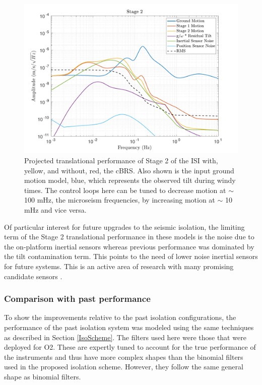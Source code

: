 \documentclass [12pt, proquest]{uwthesis}[2019]
\begin{document}
\begin{figure}[!h]
\begin{center}
\includegraphics[width=\textwidth]{cBRS_Model_ST2X.pdf}
\caption[Projected translational performance of Stage 2 of the ISI] {Projected translational performance of Stage 2 of the ISI with, yellow, and without, red, the cBRS. Also shown is the input ground motion model, blue, which represents the observed tilt during windy times. The control loops here can be tuned to decrease motion at $\sim$ 100 mHz, the microseism frequencies, by increasing motion at $\sim$ 10 mHz and vice versa.}
\label{cBRS2X}
\end{center}
\end{figure}

Of particular interest for future upgrades to the seismic isolation, the limiting term of the Stage 2 translational performance in these models is the noise due to the on-platform inertial sensors whereas previous performance was dominated by the tilt contamination term. \cite{windproofing} This points to the need of lower noise inertial sensors for future systems. This is an active area of research with many promising candidate sensors \cite{}. 

\subsubsection{Comparison with past performance}

To show the improvements relative to the past isolation configurations, the performance of the past isolation system was modeled using the same techniques as described in Section \ref{IsoScheme}. The filters used here were those that were deployed for O2. These are expertly tuned to account for the true performance of the instruments and thus have more complex shapes than the binomial filters used in the proposed isolation scheme. However, they follow the same general shape as binomial filters.
\end{document}
